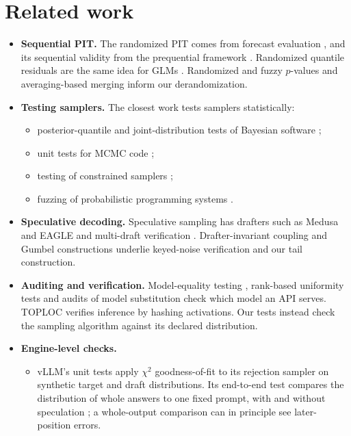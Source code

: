 \documentclass[10pt]{article}
\theoremstyle{remark}
\begin{document}
\section{Related work}
\begin{itemize}
\item \textbf{Sequential PIT.} The randomized PIT comes from forecast evaluation \cite{dgt1998,czado2009}, and its sequential validity from the prequential framework \cite{dawid1984,smdawid1993,rosenblatt1952,brockwell2007}. Randomized quantile residuals are the same idea for GLMs \cite{dunnsmyth1996}. Randomized and fuzzy $p$-values \cite{geyermeeden2005,habigerpena2011} and averaging-based merging \cite{vovkwang2020} inform our derandomization.
\item \textbf{Testing samplers.} The closest work tests samplers statistically:
  \begin{itemize}
  \item posterior-quantile and joint-distribution tests of Bayesian software \cite{cook2006,geweke2004,talts2018};
  \item unit tests for MCMC code \cite{grosse2014,gandyscott2020};
  \item testing of constrained samplers \cite{chakraborty2019,meel2020};
  \item fuzzing of probabilistic programming systems \cite{probfuzz2018}.
  \end{itemize}
\item \textbf{Speculative decoding.} Speculative sampling \cite{leviathan2023,chen2023} has drafters such as Medusa and EAGLE \cite{medusa2024,eagle2024} and multi-draft verification \cite{spectr2023}. Drafter-invariant coupling \cite{daliri2024} and Gumbel constructions \cite{maddison2014,kool2019} underlie keyed-noise verification and our tail construction.
\item \textbf{Auditing and verification.} Model-equality testing \cite{gao2024}, rank-based uniformity tests \cite{rut2025} and audits of model substitution \cite{cai2025} check which model an API serves. TOPLOC \cite{toploc2025} verifies inference by hashing activations. Our tests instead check the sampling algorithm against its declared distribution.
\item \textbf{Engine-level checks.}
  \begin{itemize}
  \item vLLM's unit tests apply $\chi^2$ goodness-of-fit to its rejection sampler on synthetic target and draft distributions. Its end-to-end test compares the distribution of whole answers to one fixed prompt, with and without speculation \cite{vllmtests}; a whole-output comparison can in principle see later-position errors.

\end{itemize}
\end{itemize}
\end{document}
